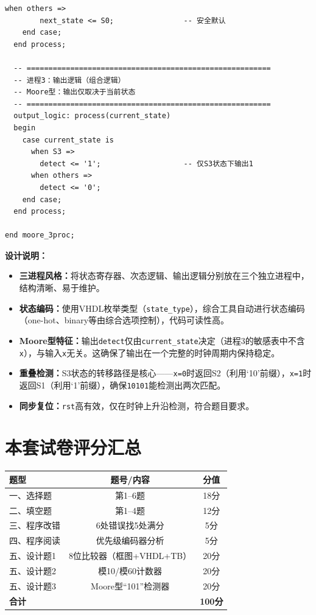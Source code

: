 \begin{lstlisting}[caption={Moore型``101''序列检测器——三进程描述}, label={lst:ans04_fsm}]
      when others =>
        next_state <= S0;                -- 安全默认
    end case;
  end process;

  -- ========================================================
  -- 进程3：输出逻辑（组合逻辑）
  -- Moore型：输出仅取决于当前状态
  -- ========================================================
  output_logic: process(current_state)
  begin
    case current_state is
      when S3 =>
        detect <= '1';                   -- 仅S3状态下输出1
      when others =>
        detect <= '0';
    end case;
  end process;

end moore_3proc;
\end{lstlisting}

\noindent\textbf{设计说明：}
\begin{itemize}
  \item \textbf{三进程风格：}将状态寄存器、次态逻辑、输出逻辑分别放在三个独立进程中，结构清晰、易于维护。
  \item \textbf{状态编码：}使用VHDL枚举类型（\texttt{state\_type}），综合工具自动进行状态编码（one-hot、binary等由综合选项控制），代码可读性高。
  \item \textbf{Moore型特征：}输出\texttt{detect}仅由\texttt{current\_state}决定（进程3的敏感表中不含\texttt{x}），与输入\texttt{x}无关。这确保了输出在一个完整的时钟周期内保持稳定。
  \item \textbf{重叠检测：}S3状态的转移路径是核心——\texttt{x=0}时返回S2（利用`10'前缀），\texttt{x=1}时返回S1（利用`1'前缀），确保\texttt{10101}能检测出两次匹配。
  \item \textbf{同步复位：}\texttt{rst}高有效，仅在时钟上升沿检测，符合题目要求。
\end{itemize}

\section*{本套试卷评分汇总}

\begin{center}
\begin{tabular}{|l|c|c|}
\hline
\textbf{题型} & \textbf{题号/内容} & \textbf{分值} \\
\hline
一、选择题   & 第1--6题 & 18分 \\
二、填空题   & 第1--4题 & 12分 \\
三、程序改错 & 6处错误找5处满分 & 5分 \\
四、程序阅读 & 优先级编码器分析 & 5分 \\
五、设计题1  & 8位比较器（框图+VHDL+TB） & 20分 \\
五、设计题2  & 模10/模60计数器 & 20分 \\
五、设计题3  & Moore型``101''检测器 & 20分 \\
\hline
\textbf{合计} & & \textbf{100分} \\
\hline
\end{tabular}
\end{center}
